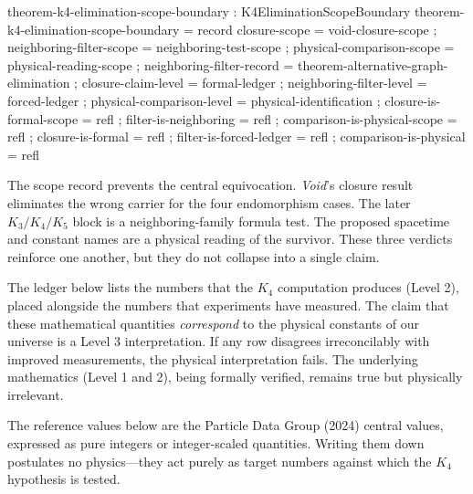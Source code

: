 \documentclass[11pt,a4paper]{book}
\begin{document}
\begin{code}
theorem-k4-elimination-scope-boundary : K4EliminationScopeBoundary
theorem-k4-elimination-scope-boundary = record
  { closure-scope               = void-closure-scope
  ; neighboring-filter-scope    = neighboring-test-scope
  ; physical-comparison-scope   = physical-reading-scope
  ; neighboring-filter-record   = theorem-alternative-graph-elimination
  ; closure-claim-level         = formal-ledger
  ; neighboring-filter-level    = forced-ledger
  ; physical-comparison-level   = physical-identification
  ; closure-is-formal-scope     = refl
  ; filter-is-neighboring       = refl
  ; comparison-is-physical-scope = refl
  ; closure-is-formal           = refl
  ; filter-is-forced-ledger     = refl
  ; comparison-is-physical      = refl }
\end{code}

The scope record prevents the central equivocation.  \textit{Void}'s closure
result eliminates the wrong carrier for the four endomorphism cases.  The
later $K_3/K_4/K_5$ block is a neighboring-family formula test.  The proposed
spacetime and constant names are a physical reading of the survivor.  These
three verdicts reinforce one another, but they do not collapse into a single
claim.

The ledger below lists the numbers that the $K_4$ computation produces (Level 2), placed alongside the numbers that experiments have measured. The claim that these mathematical quantities \emph{correspond} to the physical constants of our universe is a Level 3 interpretation. If any row disagrees irreconcilably with improved measurements, the physical interpretation fails. The underlying mathematics (Level 1 and 2), being formally verified, remains true but physically irrelevant.

The reference values below are the Particle Data Group (2024) central values, expressed as pure integers or integer-scaled quantities. Writing them down postulates no physics---they act purely as target numbers against which the $K_4$ hypothesis is tested.

\end{document}
